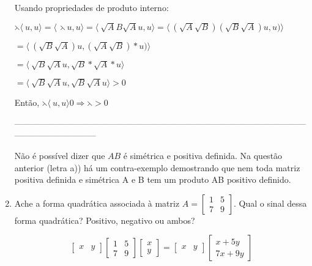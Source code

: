 \documentclass[leqno]{article}
\numberwithin{equation}{section}
\begin{document}
\begin{enumerate}
\begin{sol}
			Usando propriedades de produto interno:
			
			$\leftthreetimes \langle\ u, u \rangle = \langle\ \leftthreetimes u, u \rangle = \langle\ \sqrt{A}B\sqrt{A}u, u \rangle = \langle\ (\sqrt{A}\sqrt{B})(\sqrt{B}\sqrt{A})u, u) \rangle $
			 
			$=\langle\ (\sqrt{B}\sqrt{A})u, (\sqrt{A}\sqrt{B})\ast u) \rangle  $
			
			$= \langle\ \sqrt{B}\sqrt{A}u, \sqrt{B}\ast\sqrt{A}\ast u \rangle $ 
			
			$= \langle\ \sqrt{B}\sqrt{A}u, \sqrt{B}\sqrt{A}u \rangle > 0$
			
			Então, $\leftthreetimes \langle\ u, u \rangle 0 \Rightarrow \leftthreetimes > 0$
			
			-----------------------------------------------------------------------------------------------------------------------------------
				
			Não é possível dizer que $AB$ é simétrica e positiva definida. Na questão anterior (letra a)) há um contra-exemplo demostrando que nem toda matriz positiva definida e simétrica A e B tem um produto AB positivo definido.
		\end{sol} 
		
		
		\item Ache a forma quadrática associada à matriz $A = \begin{bmatrix}
			1 & 5 \\
			7 & 9
		\end{bmatrix}$. Qual o sinal dessa forma quadrática? Positivo, negativo ou ambos?
		
		\begin{sol} 
			$$\begin{bmatrix}
				x & y 
			\end{bmatrix}\begin{bmatrix}
				1 & 5 \\
				7 & 9
			\end{bmatrix}\begin{bmatrix}
				x  \\
				y 
			\end{bmatrix} = \begin{bmatrix}
				x & y 
			\end{bmatrix} \begin{bmatrix}
				x + 5y \\
				7x + 9y
			\end{bmatrix}$$
		

\end{sol}
\end{enumerate}
\end{document}
